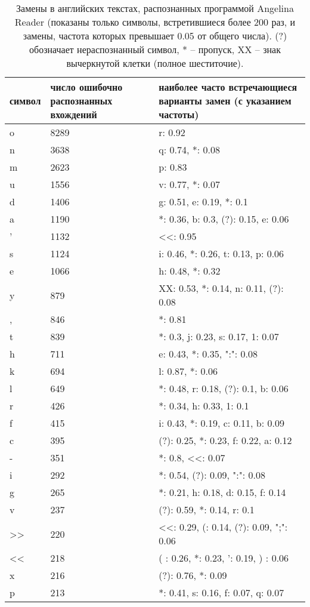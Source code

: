 \documentclass{main.tex}[subfiles]
\begin{document}
\newpage
{}

\begin{table}[H]
    \centering
    \caption{Замены в английских текстах, распознанных программой Angelina Reader (показаны только символы, встретившиеся более 200 раз, и замены, частота которых превышает 0.05 от общего числа). (?) обозначает нераспознанный символ, * -- пропуск, XX -- знак вычеркнутой клетки (полное шеститочие).}
    \begin{tabular}{l p{} p{}}
        \hline
        символ & число ошибочно распознанных вхождений & наиболее часто встречающиеся варианты замен (с указанием частоты) \\
        \hline
        o & 8289 & r: 0.92 \\
        n & 3638 & q: 0.74, *: 0.08 \\
        m & 2623 & p: 0.83 \\
        u & 1556 & v: 0.77, *: 0.07 \\
        d & 1406 & g: 0.51, e: 0.19, *: 0.1 \\
        a & 1190 & *: 0.36, b: 0.3, (?): 0.15, e: 0.06 \\
        ' & 1132 & <<: 0.95 \\
        s & 1124 & i: 0.46, *: 0.26, t: 0.13, p: 0.06 \\
        e & 1066 & h: 0.48, *: 0.32 \\
        y & 879 & XX: 0.53, *: 0.14, n: 0.11, (?): 0.08 \\
        , & 846 & *: 0.81 \\
        t & 839 & *: 0.3, j: 0.23, s: 0.17, 1: 0.07 \\
        h & 711 & e: 0.43, *: 0.35, ":": 0.08 \\
        k & 694 & l: 0.87, *: 0.06 \\
        l & 649 & *: 0.48, r: 0.18, (?): 0.1, b: 0.06 \\
        r & 426 & *: 0.34, h: 0.33, 1: 0.1 \\
        f & 415 & i: 0.43, *: 0.19, c: 0.11, b: 0.09 \\
        c & 395 & (?): 0.25, *: 0.23, f: 0.22, a: 0.12 \\
        - & 351 & *: 0.8, <<: 0.07 \\
        i & 292 & *: 0.54, (?): 0.09, ":": 0.08 \\
        g & 265 & *: 0.21, h: 0.18, d: 0.15, f: 0.14 \\
        v & 237 & (?): 0.59, *: 0.14, r: 0.1 \\
        >> & 220 & <<: 0.29, (: 0.14, (?): 0.09, ";": 0.06 \\
        << & 218 & ( : 0.26, *: 0.23, ': 0.19, ) : 0.06 \\
        x & 216 & (?): 0.76, *: 0.09 \\
        p & 213 & *: 0.41, s: 0.16, f: 0.07, q: 0.07 \\
        \hline
    \end{tabular}
    \label{table:per_letter_errs}
\end{table}


%
\end{document}
